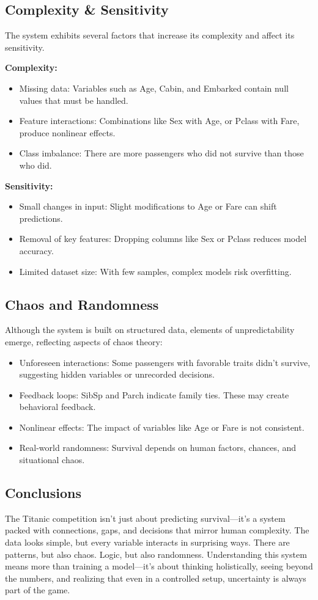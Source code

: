 \documentclass[12pt]{report}
\begin{document}
\subsection*{Complexity \& Sensitivity}
The system exhibits several factors that increase its complexity and affect its sensitivity.

\textbf{Complexity:}
\begin{itemize}
    \item Missing data: Variables such as Age, Cabin, and Embarked contain null values that must be handled.
    \item Feature interactions: Combinations like Sex with Age, or Pclass with Fare, produce nonlinear effects.
    \item Class imbalance: There are more passengers who did not survive than those who did.
\end{itemize}

\textbf{Sensitivity:}
\begin{itemize}
    \item Small changes in input: Slight modifications to Age or Fare can shift predictions.
    \item Removal of key features: Dropping columns like Sex or Pclass reduces model accuracy.
    \item Limited dataset size: With few samples, complex models risk overfitting.
\end{itemize}

\subsection*{Chaos and Randomness}
Although the system is built on structured data, elements of unpredictability emerge, reflecting aspects of chaos theory:
\begin{itemize}
    \item Unforeseen interactions: Some passengers with favorable traits didn’t survive, suggesting hidden variables or unrecorded decisions.
    \item Feedback loops: SibSp and Parch indicate family ties. These may create behavioral feedback.
    \item Nonlinear effects: The impact of variables like Age or Fare is not consistent.
    \item Real-world randomness: Survival depends on human factors, chances, and situational chaos.
\end{itemize}

\subsection*{Conclusions}
The Titanic competition isn’t just about predicting survival—it’s a system packed with connections, gaps, and decisions that mirror human complexity. The data looks simple, but every variable interacts in surprising ways. There are patterns, but also chaos. Logic, but also randomness. Understanding this system means more than training a model—it’s about thinking holistically, seeing beyond the numbers, and realizing that even in a controlled setup, uncertainty is always part of the game.
\end{document}
